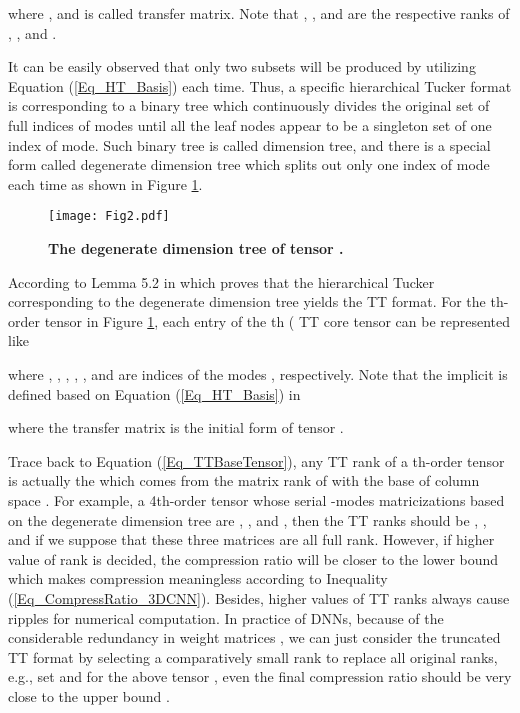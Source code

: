 \documentclass[a4paper,fleqn]{cas-dc}
\begin{document}
where , and  is called transfer matrix. Note that , , and  are the respective ranks of , , and .

It can be easily observed that only two subsets will be produced by utilizing Equation (\ref{Eq_HT_Basis}) each time. Thus, a specific hierarchical Tucker format is corresponding to a binary tree which continuously divides the original set  of full indices of modes until all the leaf nodes appear to be a singleton set of one index of mode. Such binary tree is called dimension tree, and there is a special form called degenerate dimension tree which splits out only one index of mode each time as shown in Figure \ref{Fig_degenerate_tree}.

\begin{figure}
\centering
\texttt{[image: Fig2.pdf]}
\caption{\textbf{The degenerate dimension tree of tensor .}}
\label{Fig_degenerate_tree}
\end{figure}

According to Lemma 5.2 in \citet{Grasedyck_2010_InventHT} which proves that the hierarchical Tucker corresponding to the degenerate dimension tree yields the TT format. For the th-order tensor in Figure \ref{Fig_degenerate_tree}, each entry of the th ( TT core tensor can be represented like

where , , , , , and  are indices of the modes , respectively. Note that the implicit  is defined based on Equation (\ref{Eq_HT_Basis}) in

where the transfer matrix  is the initial form of tensor .

Trace back to Equation (\ref{Eq_TTBaseTensor}), any TT rank of a th-order tensor  is actually the  which comes from the matrix rank of  with the base of column space . For example, a 4th-order tensor  whose serial -modes matricizations based on the degenerate dimension tree are , , and , then the TT ranks should be , , and  if we suppose that these three matrices are all full rank. However, if higher value of rank is decided, the compression ratio  will be closer to the lower bound  which makes compression meaningless according to Inequality (\ref{Eq_CompressRatio_3DCNN}). Besides, higher values of TT ranks always cause ripples for numerical computation. In practice of DNNs, because of the considerable redundancy in weight matrices \citep{Denil_2013_Redundancy}, we can just consider the truncated TT format by selecting a comparatively small rank to replace all original ranks, e.g., set  and  for the above tensor , even the final compression ratio  should be very close to the upper bound . 
\end{document}
